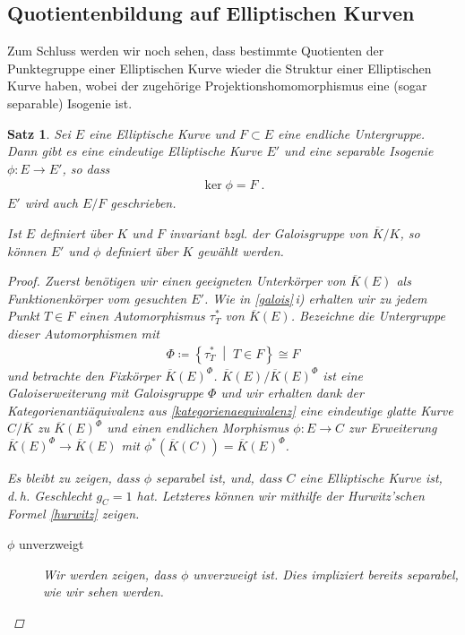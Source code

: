 \documentclass[english, german, parskip=half]{scrartcl}
\newtheorem{Satz}{Satz}[section]
\theoremstyle{definition}
\theoremstyle{remark}
\newcommand*{\K}{\ensuremath{K}} %
\newcommand*{\algK}{\ensuremath{\overline K}} %
\newcommand{\F}{F} %
\begin{document}
\subsection{Quotientenbildung auf Elliptischen Kurven}
Zum Schluss werden wir noch sehen, dass bestimmte Quotienten der
Punktegruppe einer Elliptischen Kurve wieder die Struktur einer
Elliptischen Kurve haben, wobei der zugehörige
Projektionshomomorphismus eine (sogar separable) Isogenie ist.

\begin{Satz}
  Sei $E$ eine Elliptische Kurve und $\F\subset E$ eine endliche
  Untergruppe.
  Dann gibt es eine eindeutige Elliptische Kurve $E'$ und eine
  separable Isogenie $\phi\colon E\to E'$, so dass
  \begin{gather*}
    \ker\phi = \F \;.
  \end{gather*}
  $E'$ wird auch $E/\F$ geschrieben.

  Ist $E$ definiert über $K$ und $\F$ invariant bzgl. der Galoisgruppe
  von $\algK/\K$, so können $E'$ und $\phi$ definiert über $K$ gewählt
  werden.
  \begin{proof}
    Zuerst benötigen wir einen geeigneten Unterkörper von $\algK(E)$
    als Funktionenkörper vom gesuchten $E'$.
    Wie in \autoref{galois}\,\emph{i)} erhalten wir zu jedem Punkt
    $T\in \F$ einen Automorphismus $\tau_T^*$ von $\algK(E)$.
    Bezeichne die Untergruppe dieser Automorphismen mit 
    \begin{gather*}
      \Phi\coloneqq\left\{ \tau_T^* \;\middle|\; T\in \F \right\}
      \cong F
    \end{gather*}
    und betrachte den Fixkörper $\algK(E)^\Phi$.    
    $\algK(E)/\algK(E)^\Phi$ ist eine Galoiserweiterung mit
    Galoisgruppe $\Phi$ und wir erhalten dank der Kategorienantiäquivalenz
    aus \autoref{kategorienaequivalenz} eine eindeutige glatte Kurve
    $C/\algK$ zu $\algK(E)^\Phi$ und einen endlichen Morphismus
    $\phi\colon E\to C$ zur Erweiterung $\algK(E)^\Phi\to\algK(E)$
    mit $\phi^*(\algK(C))=\algK(E)^\Phi$.
    
    Es bleibt zu zeigen, dass $\phi$ separabel ist, und, dass $C$ eine
    Elliptische Kurve ist, d.\,h. Geschlecht $g_C=1$ hat.
    Letzteres können wir mithilfe der Hurwitz'schen Formel
    \autoref{hurwitz} zeigen.

    \begin{description}
    \item[$\phi$ unverzweigt]
      Wir werden zeigen, dass $\phi$ unverzweigt ist. Dies impliziert
      bereits separabel, wie wir sehen werden.


\end{description}
\end{proof}
\end{Satz}
\end{document}
